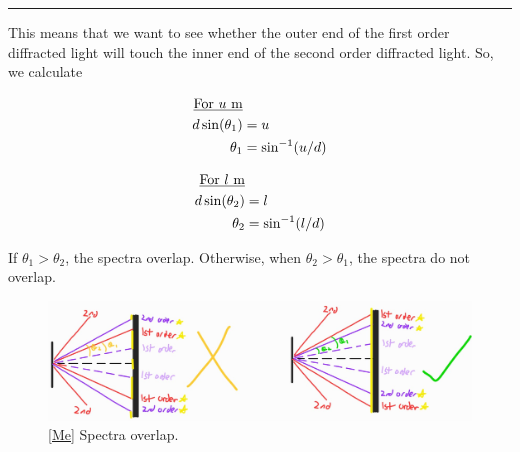 \documentclass[oneside]{book}
\begin{document}
\begin{itemize}
\begin{example}{}{}
        \rule{20cm-137.0549pt-25pt}{0.05mm}\vspace{0.5\baselineskip}
        This means that we want to see whether the outer end of the first order diffracted light will touch the inner end of the second order diffracted light. So, we calculate\vspace{-1em}
        \begin{center}
            \begin{minipage}{0.25\textwidth}
                    \begin{align*}
                        \text{\underline{For \(u\) m}}&\\
                        d\sin(\theta_1)&=u\\
                        \theta_1&=\sin^{-1}(u/d)
                    \end{align*}
            \end{minipage}\hspace{2cm}
            \begin{minipage}{0.25\textwidth}
                    \begin{align*}
                        \text{\underline{For \(l\) m}}&\\
                        d\sin(\theta_2)&=l\\
                        \theta_2&=\sin^{-1}(l/d)
                    \end{align*}
            \end{minipage}
        \end{center}
        If \(\theta_1>\theta_2\), the spectra overlap. Otherwise, when \(\theta_2>\theta_1\), the spectra do not overlap.
        \begin{figure}[H]
            \centering
            \includegraphics[width=\textwidth]{../images/spectra-overlap.jpg}
            \caption{\ref{Me} Spectra overlap.}
            \label{fig:spectra-overlap}
        \end{figure}
    \end{example}
\end{itemize}
\end{document}
